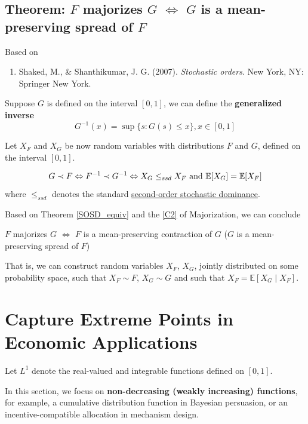 \documentclass[11pt]{elegantbook}
\begin{document}
\subsection{Theorem: $F$ majorizes $G$ $\Leftrightarrow$ $G$ is a mean-preserving spread of $F$}
Based on
\begin{enumerate}[$\circ$]
    \item Shaked, M., \& Shanthikumar, J. G. (2007). \textit{Stochastic orders}. New York, NY: Springer New York.
\end{enumerate}

\begin{definition}
    \normalfont
    Suppose $G$ is defined on the interval $[0,1]$, we can define the \textbf{generalized inverse}
    $$G^{-1}(x)=\sup\{s:G(s)\leq x\}, x\in [0,1]$$
\end{definition}

Let $X_F$ and $X_G$ be now random variables with distributions $F$ and $G$, defined on the interval $[0,1]$.
\begin{theorem}
    $$G\prec F \Leftrightarrow F^{-1}\prec G^{-1} \Leftrightarrow X_{G}\leq_{ssd}X_F \textnormal{ and }\mathbb{E}[X_G]=\mathbb{E}[X_F]$$
    where $\leq_{ssd}$ denotes the standard \underline{second-order stochastic dominance}.
\end{theorem}
Based on Theorem \ref{SOSD_equiv} and the \ref{C2} of Majorization, we can conclude
\begin{corollary}\label{Maj_Equiv}
    \begin{center}
        $F$ majorizes $G$ $\Leftrightarrow$ $F$ is a mean-preserving contraction of $G$ ($G$ is a mean-preserving spread of $F$)
    \end{center}
\end{corollary}
That is, we can construct random variables $X_F$, $X_G$,
jointly distributed on some probability space, such that $X_F \sim F$, $X_G \sim G$ and such that $X_F = \mathbb{E}[X_G \mid X_F]$.

\section{Capture Extreme Points in Economic Applications}
Let $L^1$ denote the real-valued and integrable functions defined on $[0,1]$.

In this section, we focus on \textbf{non-decreasing (weakly increasing) functions}, for example, a cumulative distribution function in Bayesian persuasion, or an incentive-compatible allocation in mechanism design.
\end{document}
